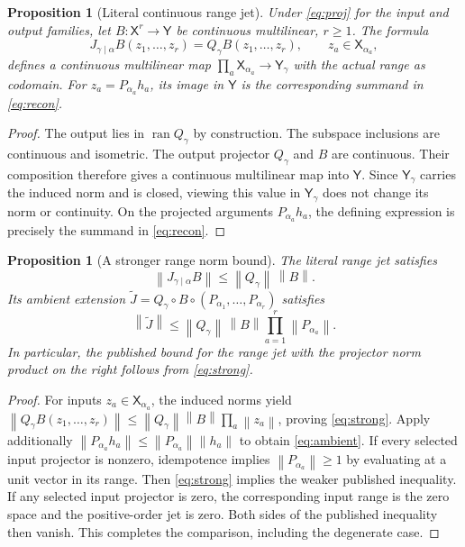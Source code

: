 \documentclass[11pt]{article}
\newtheorem{proposition}[theorem]{Proposition}
\theoremstyle{remark}\newtheorem{remark}[theorem]{Remark}
\newcommand{\X}{\mathsf X}\newcommand{\Y}{\mathsf Y}\newcommand{\Z}{\mathsf Z}
\newcommand{\norm}[1]{\left\lVert#1\right\rVert}
\newcommand{\op}{\operatorname}
\begin{document}
\begin{proposition}[Literal continuous range jet]\label{prop:rangejet}
Under \eqref{eq:proj} for the input and output families, let $B:\X^r\to\Y$ be continuous multilinear, $r\ge1$. The formula
\[
J_{\gamma\mid\alpha}B(z_1,\ldots,z_r)
=Q_\gamma B(z_1,\ldots,z_r),\qquad z_a\in\X_{\alpha_a},
\]
defines a continuous multilinear map $\prod_a\X_{\alpha_a}\to\Y_\gamma$ with the actual range as codomain. For $z_a=P_{\alpha_a}h_a$, its image in $\Y$ is the corresponding summand in \eqref{eq:recon}.
\end{proposition}
\begin{proof}
The output lies in $\op{ran}Q_\gamma$ by construction. The subspace inclusions are continuous and isometric. The output projector $Q_\gamma$ and $B$ are continuous. Their composition therefore gives a continuous multilinear map into $\Y$. Since $\Y_\gamma$ carries the induced norm and is closed, viewing this value in $\Y_\gamma$ does not change its norm or continuity. On the projected arguments $P_{\alpha_a}h_a$, the defining expression is precisely the summand in \eqref{eq:recon}.
\end{proof}

\begin{proposition}[A stronger range norm bound]\label{prop:norm}
The literal range jet satisfies
\begin{equation}\label{eq:strong}
\norm{J_{\gamma\mid\alpha}B}\le \norm{Q_\gamma}\,\norm{B}.
\end{equation}
Its ambient extension $\widetilde J=Q_\gamma\circ B\circ(P_{\alpha_1},\ldots,P_{\alpha_r})$ satisfies
\begin{equation}\label{eq:ambient}
\norm{\widetilde J}\le\norm{Q_\gamma}\,\norm{B}\prod_{a=1}^r\norm{P_{\alpha_a}}.
\end{equation}
In particular, the published bound for the range jet with the projector norm product on the right follows from \eqref{eq:strong}.
\end{proposition}
\begin{proof}
For inputs $z_a\in\X_{\alpha_a}$, the induced norms yield
$\norm{Q_\gamma B(z_1,\ldots,z_r)}\le\norm{Q_\gamma}\norm{B}\prod_a\norm{z_a}$, proving \eqref{eq:strong}. Apply additionally $\norm{P_{\alpha_a}h_a}\le\norm{P_{\alpha_a}}\norm{h_a}$ to obtain \eqref{eq:ambient}. If every selected input projector is nonzero, idempotence implies $\norm{P_{\alpha_a}}\ge1$ by evaluating at a unit vector in its range. Then \eqref{eq:strong} implies the weaker published inequality. If any selected input projector is zero, the corresponding input range is the zero space and the positive-order jet is zero. Both sides of the published inequality then vanish. This completes the comparison, including the degenerate case.
\end{proof}
\end{document}
